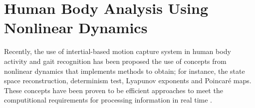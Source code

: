 % 
% 
% 
% 
% 
% 
% 
% 
% 



\section{Human Body Analysis Using Nonlinear Dynamics}

Recently, the use of intertial-based motion capture system in human body activity 
and gait recognition has been proposed the use of concepts from nonlinear dynamics 
that implements methods to obtain; for instance, the state space reconstruction,
determinism test, Lyapunov exponents and Poincar\'e maps.
These concepts have been proven to be efficient approaches to meet the computitional 
requirements for processing information in real time
\cite{J.FrankS.Mannor2010, Sama2013, Gouwanda2012,Perc2005, Akiduki2013,Akiduki2014}. 

